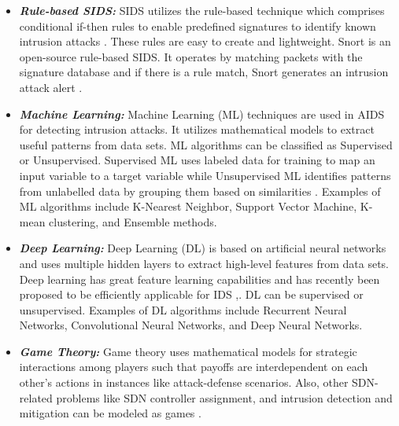 \documentclass[conference]{IEEEtran}
\begin{document}
\begin{itemize}
    \item \textbf{\emph{Rule-based SIDS:}} SIDS utilizes the rule-based technique which comprises conditional if-then rules to enable predefined signatures to identify known intrusion attacks \cite{9210368}. These rules are easy to create and lightweight. Snort is an open-source rule-based SIDS. It operates by matching packets with the signature database and if there is a rule match, Snort generates an intrusion attack alert \cite{8365396}.
\end{itemize}
\begin{itemize}
    \item \textbf{\emph{Machine Learning:}} Machine Learning (ML) techniques are used in AIDS  for detecting intrusion attacks. It utilizes mathematical models to extract useful patterns from data sets. ML algorithms can be classified as Supervised or Unsupervised. Supervised ML uses labeled data for training to map an input variable to a target variable while Unsupervised ML identifies patterns from unlabelled data by grouping them based on similarities \cite{iasc.2023.026769}. Examples of ML algorithms include K-Nearest Neighbor, Support Vector Machine, K-mean clustering, and Ensemble methods. 
\end{itemize}

\begin{itemize}
 \item \textbf{\emph{Deep Learning:}} Deep Learning (DL) is based on artificial neural networks and uses multiple hidden layers to extract high-level features from data sets. Deep learning has great feature learning capabilities and has recently been proposed to be efficiently applicable for IDS \cite{Peng},\cite{10017381}. DL can be supervised or unsupervised. Examples of DL algorithms include Recurrent Neural Networks, Convolutional Neural Networks, and Deep Neural Networks.
 \end{itemize}

 \begin{itemize}
 \item \textbf{\emph{Game Theory:}} Game theory uses mathematical models for strategic interactions among players such that payoffs are interdependent on each other's actions in instances like attack-defense scenarios. Also, other SDN-related problems like SDN controller assignment, and intrusion detection and mitigation can be modeled as games \cite{8746112}.

 \end{itemize}
\end{document}
